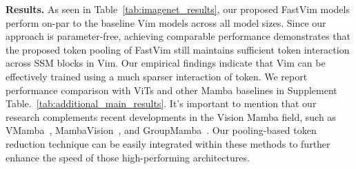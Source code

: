 \begin{table}[ht]
    \caption{Classification benchmarks on \textbf{ImageNet-1k}~\cite{imagenet} dataset. All models are trained from scratch on Image size of $224\times224$. $\dag$ denotes we extend the training of Vim to base-size model. T refers to Tiny, S to Small, and B to Base size models.} 
\vspace{-13pt}
    \begin{center}
\end{center}
\vspace{-8pt}
    \label{tab:imagenet_results}
\end{table}



\noindent \textbf{Results.} As seen in Table~\ref{tab:imagenet_results}, our proposed FastVim models perform on-par to the baseline Vim models across all model sizes. Since our approach is parameter-free, achieving comparable performance demonstrates that the proposed token pooling of FastVim still maintains sufficient token interaction across SSM blocks in Vim. Our empirical findings indicate that Vim can be effectively trained using a much sparser interaction of token. We report performance comparison with ViTs and other Mamba baselines in Supplement Table.~\ref{tab:additional_main_results}. It's important to mention that our research complements recent developments in the Vision Mamba field, such as VMamba~\cite{vmamba}, MambaVision~\cite{mambavision}, and GroupMamba~\cite{groupmamba}. Our pooling-based token reduction technique can be easily integrated within these methods to further enhance the speed of those high-performing architectures.


